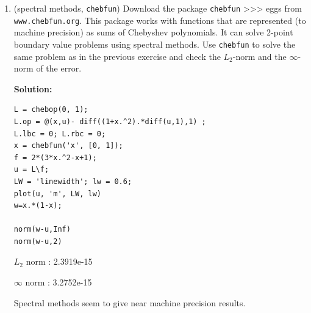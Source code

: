 \documentclass[letterpaper,12pt]{article}
\begin{document}
\begin{enumerate}
\item (spectral methods, \verb+chebfun+)
Download the package \verb+chebfun+
>>> eggs from \verb+www.chebfun.org+. This package works
with functions that are represented (to machine precision) as sums of Chebyshev polynomials.
It can solve 2-point boundary value problems using spectral methods.  Use \verb+chebfun+
to solve the same problem as in the previous exercise and check the $L_2$-norm and the
$\infty$-norm of the error. 

{\bf Solution:}

	\begin{lstlisting}[style=MyMatlabstyle]
L = chebop(0, 1);
L.op = @(x,u)- diff((1+x.^2).*diff(u,1),1) ;
L.lbc = 0; L.rbc = 0;
x = chebfun('x', [0, 1]);
f = 2*(3*x.^2-x+1);
u = L\f;
LW = 'linewidth'; lw = 0.6;
plot(u, 'm', LW, lw)
w=x.*(1-x);

norm(w-u,Inf)
norm(w-u,2)
\end{lstlisting}

 $L_2$ norm : 2.3919e-15
 
 $\infty$ norm : 3.2752e-15
 
 Spectral methods seem to give near machine precision results.
\end{enumerate}
\end{document}
